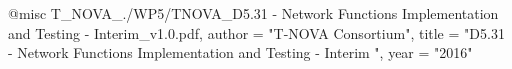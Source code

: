 @misc{ T_NOVA_./WP5/TNOVA_D5.31 - Network Functions Implementation and Testing - Interim_v1.0.pdf,
       author = "{T-NOVA Consortium}",
       title = "D5.31 - Network Functions Implementation and Testing - Interim ",
       year = "2016" }
